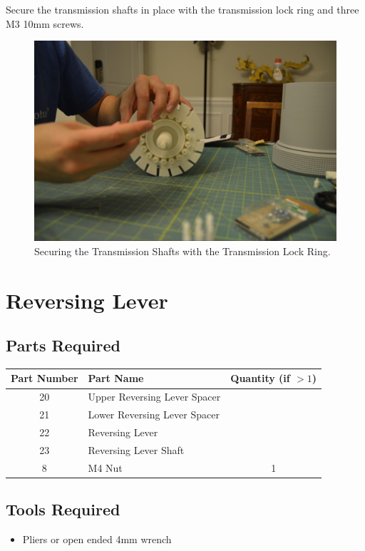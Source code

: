 \documentclass[openany]{book}
\begin{document}
Secure the transmission shafts in place with the transmission lock ring and three M3 10mm screws.

\begin{figure}[!ht]
	\centering
	\includegraphics[width=.75\textwidth]{images/image15.jpg}
	\caption{Securing the Transmission Shafts with the Transmission Lock Ring.}
	\label{fig:image15}	
\end{figure}


\chapter{Reversing Lever}
\section{Parts Required}
\begin{table}[!ht]
	\centering
	\begin{tabular}{clc}
		Part Number & Part Name & Quantity (if $>1$) \\ \hline
		20 & Upper Reversing Lever Spacer & \\
		21 & Lower Reversing Lever Spacer & \\
		22 & Reversing Lever & \\
		23 & Reversing Lever Shaft & \\ \hline \hline
		8 & M4 Nut & 1
	\end{tabular}
\end{table}


\section{Tools Required}
\begin{itemize}
	\item Pliers or open ended 4mm wrench
\end{itemize}
\end{document}
